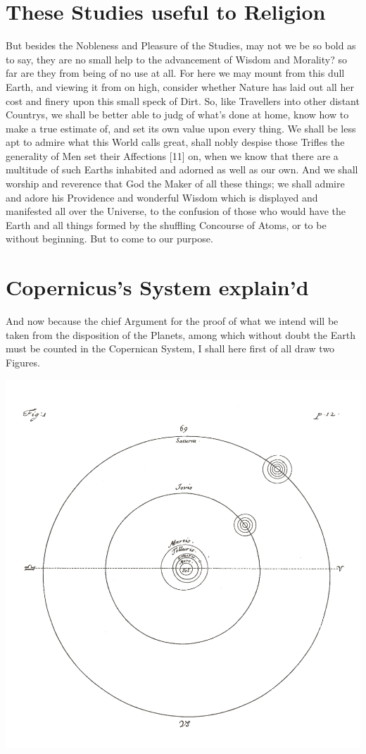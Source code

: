 \documentclass[letterpaper]{book}
\begin{document}
\section{These Studies useful to Religion}

But besides the Nobleness and Pleasure of the Studies, may not we be so bold
as to say, they are no small help to the advancement of Wisdom and Morality?
so far are they from being of no use at all. For here we may mount from this
dull Earth, and viewing it from on high, consider whether Nature has laid
out all her cost and finery upon this small speck of Dirt.  So, like
Travellers into other distant Countrys, we shall be better able to judg of
what's done at home, know how to make a true estimate of, and set its own
value upon every thing. We shall be less apt to admire what this World calls
great, shall nobly despise those Trifles the generality of Men set their
Affections [11] on, when we know that there are a multitude of such Earths
inhabited and adorned as well as our own. And we shall worship and reverence
that God the Maker of all these things; we shall admire and adore his
Providence and wonderful Wisdom which is displayed and manifested all over
the Universe, to the confusion of those who would have the Earth and all
things formed by the shuffling Concourse of Atoms, or to be without
beginning. But to come to our purpose.


\section{Copernicus's System explain'd}

And now because the chief Argument for the proof of what we intend will be
taken from the disposition of the Planets, among which without doubt the
Earth must be counted in the Copernican System, I shall here first of all
draw two Figures. 

\begin{center}
	\includegraphics[width=.90 \textwidth]{ct_1_en.jpg}
\end{center}
\end{document}
